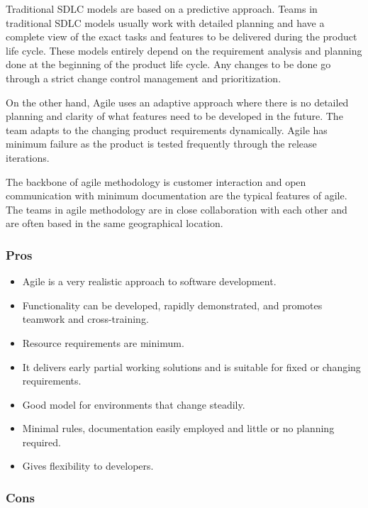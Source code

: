 Traditional SDLC models are based on a predictive approach. Teams in traditional SDLC models usually work with detailed planning and have a complete view of the exact tasks and features to be delivered during the product life cycle. These models entirely depend on the requirement analysis and planning done at the beginning of the product life cycle. Any changes to be done go 
through a strict change control management and prioritization.~\cite{agile}

On the other hand, Agile uses an adaptive approach where there is no detailed planning and clarity
of what features need to be developed in the future. The team adapts to the changing product requirements dynamically. Agile has minimum failure as the product is tested frequently through the release iterations.

The backbone of agile methodology is customer interaction and open communication with minimum documentation are the typical features of agile. The teams in agile methodology are in close collaboration 
with each other and are often based in the same geographical location.

\subsubsection{Pros}

\begin{itemize}
    \item Agile is a very realistic approach to software development.
    \item Functionality can be developed, rapidly demonstrated, and promotes teamwork and cross-training. 
    \item Resource requirements are minimum.
    \item It delivers early partial working solutions and is suitable for fixed or changing requirements.
    \item Good model for environments that change steadily.
    \item Minimal rules, documentation easily employed and little or no planning required.
    \item Gives flexibility to developers.
\end{itemize}

\subsubsection{Cons}


